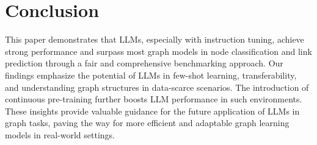 

\section{Conclusion}
\label{sec:conclusion}


This paper demonstrates that LLMs, especially with instruction tuning, achieve strong performance and surpass most graph models in node classification and link prediction through a fair and comprehensive benchmarking approach. Our findings emphasize the potential of LLMs in few-shot learning, transferability, and understanding graph structures in data-scarce scenarios. The introduction of continuous pre-training further boosts LLM performance in such environments. These insights provide valuable guidance for the future application of LLMs in graph tasks, paving the way for more efficient and adaptable graph learning models in real-world settings.